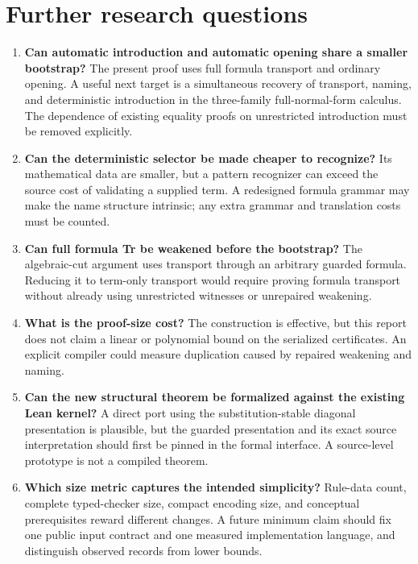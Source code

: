 \section{Further research questions}

\begin{enumerate}
\item \textbf{Can automatic introduction and automatic opening share a
      smaller bootstrap?} The present proof uses full formula transport and
      ordinary opening. A useful next target is a simultaneous recovery of
      transport, naming, and deterministic introduction in the three-family
      full-normal-form calculus. The dependence of existing equality proofs
      on unrestricted introduction must be removed explicitly.
\item \textbf{Can the deterministic selector be made cheaper to recognize?}
      Its mathematical data are smaller, but a pattern recognizer can exceed
      the source cost of validating a supplied term. A redesigned formula
      grammar may make the name structure intrinsic; any extra grammar and
      translation costs must be counted.
\item \textbf{Can full formula Tr be weakened before the bootstrap?}
      The algebraic-cut argument uses transport through an arbitrary guarded
      formula. Reducing it to term-only transport would require proving
      formula transport without already using unrestricted witnesses or
      unrepaired weakening.
\item \textbf{What is the proof-size cost?} The construction is effective,
      but this report does not claim a linear or polynomial bound on the
      serialized certificates. An explicit compiler could measure duplication
      caused by repaired weakening and naming.
\item \textbf{Can the new structural theorem be formalized against the
      existing Lean kernel?} A direct port using the substitution-stable
      diagonal presentation is plausible, but the guarded presentation and
      its exact source interpretation should first be pinned in the formal
      interface. A source-level prototype is not a compiled theorem.
\item \textbf{Which size metric captures the intended simplicity?}
      Rule-data count, complete typed-checker size, compact encoding size,
      and conceptual prerequisites reward different changes. A future
      minimum claim should fix one public input contract and one measured
      implementation language, and distinguish observed records from lower
      bounds.
\end{enumerate}

